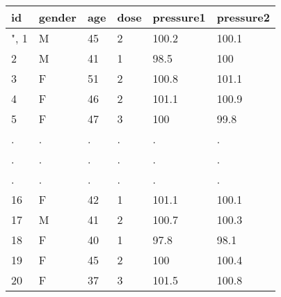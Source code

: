 \documentclass[preview]{standalone}
\begin{document}
\centering \begin{tabular}{llllll}
\hline
id & gender & age & dose & pressure1 & pressure2 \\\hline",
1 & M & 45 & 2 & 100.2 & 100.1 \\
2 & M & 41 & 1 & 98.5 & 100 \\
3 & F & 51 & 2 & 100.8 & 101.1 \\
4 & F & 46 & 2 & 101.1 & 100.9 \\
5 & F & 47 & 3 & 100 & 99.8 \\
. & . & . & . & . & . \\
. & . & . & . & . & . \\
. & . & . & . & . & . \\
16 & F & 42 & 1 & 101.1 & 100.1 \\
17 & M & 41 & 2 & 100.7 & 100.3 \\
18 & F & 40 & 1 & 97.8 & 98.1 \\
19 & F & 45 & 2 & 100 & 100.4 \\
20 & F & 37 & 3 & 101.5 & 100.8 \\
\hline
\end{tabular}
\end{document}
